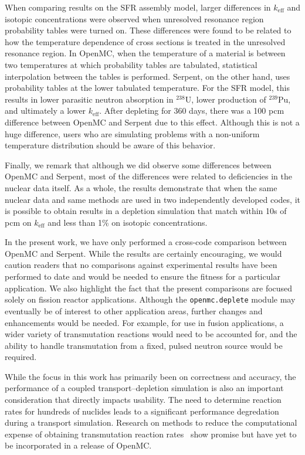 \documentclass[3p,authoryear]{elsarticle}
\begin{document}
When comparing results on the SFR assembly model, larger differences in
$k_\text{eff}$ and isotopic concentrations were observed when unresolved
resonance region probability tables were turned on. These differences were found
to be related to how the temperature dependence of cross sections is treated in
the unresolved resonance region. In OpenMC, when the temperature of a material
is between two temperatures at which probability tables are tabulated,
statistical interpolation between the tables is performed. Serpent, on the other
hand, uses probability tables at the lower tabulated temperature. For the SFR
model, this results in lower parasitic neutron absorption in $^{238}$U, lower
production of $^{239}$Pu, and ultimately a lower $k_\text{eff}$. After depleting
for 360 days, there was a 100 pcm difference between OpenMC and Serpent due to
this effect. Although this is not a huge difference, users who are simulating
problems with a non-uniform temperature distribution should be aware of this
behavior.

Finally, we remark that although we did observe some differences between OpenMC
and Serpent, most of the differences were related to deficiencies in the nuclear
data itself. As a whole, the results demonstrate that when the same nuclear data
and same methods are used in two independently developed codes, it is possible
to obtain results in a depletion simulation that match within 10s of pcm on
$k_\text{eff}$ and less than 1\% on isotopic concentrations.

In the present work, we have only performed a cross-code comparison between
OpenMC and Serpent. While the results are certainly encouraging, we would
caution readers that no comparisons against experimental results have been
performed to date and would be needed to ensure the fitness for a particular
application. We also highlight the fact that the present comparisons are focused
solely on fission reactor applications. Although the \texttt{openmc.deplete}
module may eventually be of interest to other application areas, further changes
and enhancements would be needed. For example, for use in fusion applications, a
wider variety of transmutation reactions would need to be accounted for, and the
ability to handle transmutation from a fixed, pulsed neutron source would be
required.

While the focus in this work has primarily been on correctness and accuracy, the
performance of a coupled transport--depletion simulation is also an important
consideration that directly impacts usability. The need to determine reaction
rates for hundreds of nuclides leads to a significant performance degredation
during a transport simulation. Research on methods to reduce the computational
expense of obtaining transmutation reaction rates~\cite{salcedoperez2019mc} show
promise but have yet to be incorporated in a release of OpenMC.
\end{document}
